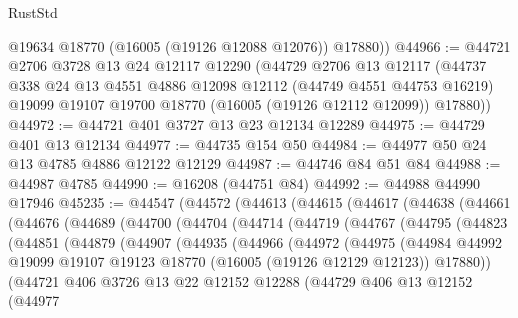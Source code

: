 \begin{lexlean}{RustStd}
\begin{coremodule}
        @19634
        @18770
        (@16005 (@19126 @12088 @12076))
        @17880))
@44966 := @44721
    @2706
    @3728
    @13
    @24
    @12117
    @12290
    (@44729
      @2706
      @13
      @12117
      (@44737
        @338
        @24
        @13
        @4551
        @4886
        @12098
        @12112
        (@44749 @4551 @44753 @16219)
        @19099
        @19107
        @19700
        @18770
        (@16005 (@19126 @12112 @12099))
        @17880))
@44972 := @44721 @401 @3727 @13 @23 @12134 @12289
@44975 := @44729 @401 @13 @12134
@44977 := @44735 @154 @50
@44984 := @44977 @50 @24 @13 @4785 @4886 @12122 @12129
@44987 := @44746 @84 @51 @84
@44988 := @44987 @4785
@44990 := @16208 (@44751 @84)
@44992 := @44988 @44990 @17946
@45235 := @44547
    (@44572
      (@44613
        (@44615
          (@44617
            (@44638
              (@44661
                (@44676
                  (@44689
                    (@44700
                      (@44704
                        (@44714
                          (@44719
                            (@44767
                              (@44795
                                (@44823
                                  (@44851
                                    (@44879
                                      (@44907
                                        (@44935
                                          (@44966
                                            (@44972
                                              (@44975
                                                (@44984
                                                  @44992
                                                  @19099
                                                  @19107
                                                  @19123
                                                  @18770
                                                  (@16005 (@19126 @12129 @12123))
                                                  @17880))
                                              (@44721
                                                @406
                                                @3726
                                                @13
                                                @22
                                                @12152
                                                @12288
                                                (@44729
                                                  @406
                                                  @13
                                                  @12152
                                                  (@44977

\end{coremodule}
\end{lexlean}
